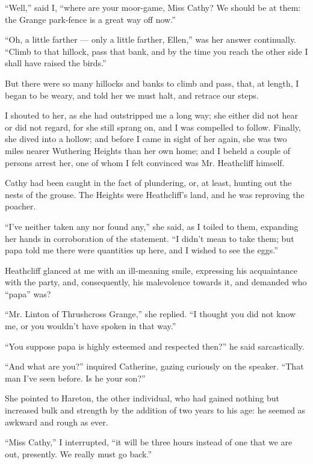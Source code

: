 \par “Well,” said I, “where are your moor-game, Miss Cathy? We should be at them: the Grange park-fence is a great way off now.”
\par “Oh, a little farther — only a little farther, Ellen,” was her answer continually. “Climb to that hillock, pass that bank, and by the time you reach the other side I shall have raised the birds.”
\par But there were so many hillocks and banks to climb and pass, that, at length, I began to be weary, and told her we must halt, and retrace our steps.
\par I shouted to her, as she had outstripped me a long way; she either did not hear or did not regard, for she still sprang on, and I was compelled to follow. Finally, she dived into a hollow; and before I came in sight of her again, she was two miles nearer Wuthering Heights than her own home; and I beheld a couple of persons arrest her, one of whom I felt convinced was Mr. Heathcliff himself.
\par Cathy had been caught in the fact of plundering, or, at least, hunting out the nests of the grouse. The Heights were Heathcliff's land, and he was reproving the poacher.
\par “I've neither taken any nor found any,” she said, as I toiled to them, expanding her hands in corroboration of the statement. “I didn't mean to take them; but papa told me there were quantities up here, and I wished to see the eggs.”
\par Heathcliff glanced at me with an ill-meaning smile, expressing his acquaintance with the party, and, consequently, his malevolence towards it, and demanded who “papa” was?
\par “Mr. Linton of Thrushcross Grange,” she replied. “I thought you did not know me, or you wouldn't have spoken in that way.”
\par “You suppose papa is highly esteemed and respected then?” he said sarcastically.
\par “And what are you?” inquired Catherine, gazing curiously on the speaker. “That man I've seen before. Is he your son?”
\par She pointed to Hareton, the other individual, who had gained nothing but increased bulk and strength by the addition of two years to his age: he seemed as awkward and rough as ever.
\par “Miss Cathy,” I interrupted, “it will be three hours instead of one that we are out, presently. We really must go back.”
